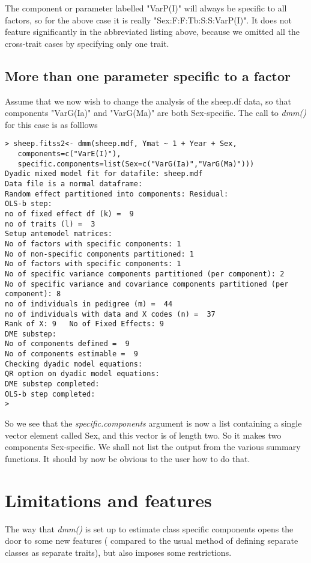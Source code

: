 \documentclass[titlepage]{article}  %
\begin{document}
The component or parameter labelled "VarP(I)" will always be specific to  all factors, so for the above case it is really "Sex:F:F:Tb:S:S:VarP(I)". It does not feature significantly in the abbreviated listing above, because we omitted all the cross-trait cases by specifying only one trait.

\subsection{More than one parameter specific to a factor}
Assume that we now wish to change the analysis of the sheep.df data, so that components "VarG(Ia)" and "VarG(Ma)" are both Sex-specific.  The call to {\em dmm()} for this case is as folllows
\begin{verbatim}
> sheep.fitss2<- dmm(sheep.mdf, Ymat ~ 1 + Year + Sex,
   components=c("VarE(I)"),
   specific.components=list(Sex=c("VarG(Ia)","VarG(Ma)")))
Dyadic mixed model fit for datafile: sheep.mdf  
Data file is a normal dataframe:
Random effect partitioned into components: Residual:
OLS-b step:
no of fixed effect df (k) =  9 
no of traits (l) =  3 
Setup antemodel matrices:
No of factors with specific components: 1 
No of non-specific components partitioned: 1 
No of factors with specific components: 1 
No of specific variance components partitioned (per component): 2 
No of specific variance and covariance components partitioned (per component): 8 
no of individuals in pedigree (m) =  44 
no of individuals with data and X codes (n) =  37 
Rank of X: 9   No of Fixed Effects: 9 
DME substep:
No of components defined =  9 
No of components estimable =  9 
Checking dyadic model equations:
QR option on dyadic model equations:
DME substep completed:
OLS-b step completed:
> 
\end{verbatim}
So we see that the {\em specific.components} argument  is now a list containing a single vector element called Sex, and this vector is of length two. So it makes two components Sex-specific. We shall not list the output from the various summary functions. It should by now be obvious to the user how to do that.

\section{Limitations and features}
The way that  {\em dmm()} is set up to estimate class specific components opens the door to some new features ( compared to the usual method of defining separate classes as separate traits), but also imposes some restrictions.
\end{document}
